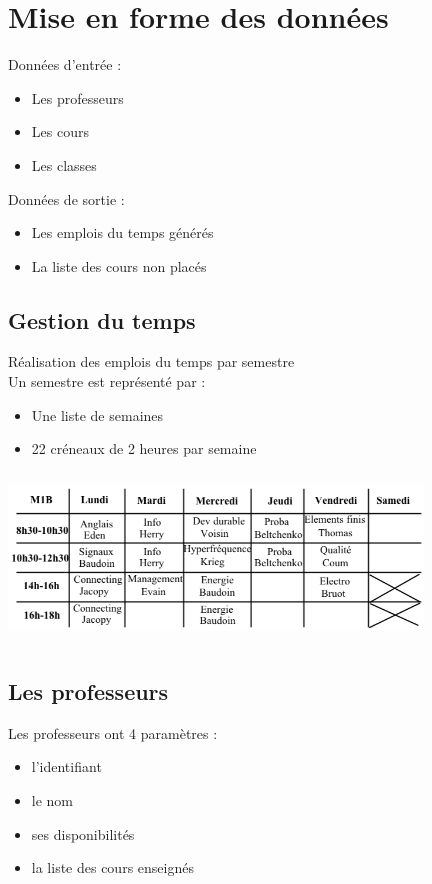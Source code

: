 \documentclass{beamer}
\begin{document}
\section{Mise en forme des données}
\begin{frame}
Données d'entrée : 
\begin{itemize}
\item Les professeurs
\item Les cours
\item Les classes
\end{itemize}
\vspace{\baselineskip}
Données de sortie :
\begin{itemize}
\item Les emplois du temps générés
\item La liste des cours non placés
\end{itemize}
\end{frame}

\subsection{Gestion du temps}
\begin{frame}
Réalisation des emplois du temps par semestre\\
\vspace{\baselineskip}
Un semestre est représenté par :
\begin{itemize}
\item Une liste de semaines
\item 22 créneaux de 2 heures par semaine
\end{itemize}
\end{frame}

\begin{frame}
\begin{center}
\includegraphics [width=110mm, height=45mm]{Dessin2.png}
\end{center}
\end{frame}

\subsection{Les professeurs}
\begin{frame} 
Les professeurs ont 4 paramètres : 
\begin{itemize}
\item l'identifiant
\item le nom
\item ses disponibilités
\item la liste des cours enseignés
\end{itemize}
\end{frame}
\end{document}
